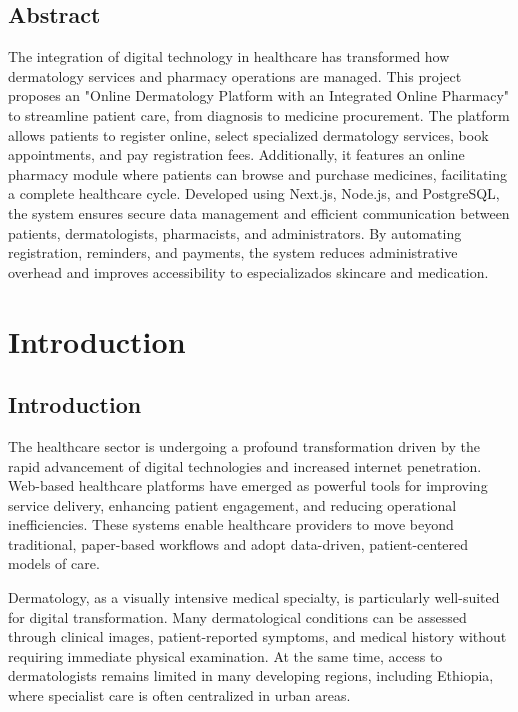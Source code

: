 \documentclass[12pt,a4paper]{report}
\begin{document}
\listoffigures
{}

\newpage
\section*{Abstract}
The integration of digital technology in healthcare has transformed how dermatology services and pharmacy operations are managed. This project proposes an "Online Dermatology Platform with an Integrated Online Pharmacy" to streamline patient care, from diagnosis to medicine procurement. The platform allows patients to register online, select specialized dermatology services, book appointments, and pay registration fees. Additionally, it features an online pharmacy module where patients can browse and purchase medicines, facilitating a complete healthcare cycle. Developed using Next.js, Node.js, and PostgreSQL, the system ensures secure data management and efficient communication between patients, dermatologists, pharmacists, and administrators. By automating registration, reminders, and payments, the system reduces administrative overhead and improves accessibility to especializados skincare and medication.

\tableofcontents

\newpage
{}

\chapter{Introduction}

\section{Introduction}
The healthcare sector is undergoing a profound transformation driven by the rapid advancement of digital technologies and increased internet penetration. Web-based healthcare platforms have emerged as powerful tools for improving service delivery, enhancing patient engagement, and reducing operational inefficiencies. These systems enable healthcare providers to move beyond traditional, paper-based workflows and adopt data-driven, patient-centered models of care.

Dermatology, as a visually intensive medical specialty, is particularly well-suited for digital transformation. Many dermatological conditions can be assessed through clinical images, patient-reported symptoms, and medical history without requiring immediate physical examination. At the same time, access to dermatologists remains limited in many developing regions, including Ethiopia, where specialist care is often centralized in urban areas.
\end{document}
